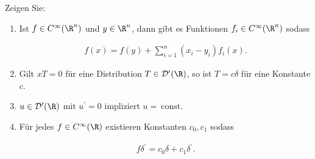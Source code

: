 
\begin{exercise}

Zeigen Sie:

\begin{enumerate}[label = (\roman*)]

    \item Ist $f \in C^\infty(\R^n)$ und $y \in \R^n$, dann gibt es Funktionen $f_i \in C^\infty(\R^n)$ sodass
    
    \begin{align*}
        f(x) = f(y) + \sum_{i=1}^n (x_i - y_i) f_i(x).
    \end{align*}

    \item Gilt $xT = 0$ für eine Distribution $T \in \mathcal{D}^\prime(\R)$, so ist $T = c \delta$ für eine Konstante $c$.
    \item $u \in \mathcal{D}^\prime(\R)$ mit $u^\prime = 0$ impliziert $u = ~\text{const}$.
    \item Für jedes $f \in C^\infty(\R)$ existieren Konstanten $c_0, c_1$ sodass
    
    \begin{align*}
        f \delta^\prime
        =
        c_0 \delta
        +
        c_1 \delta^\prime.
    \end{align*}

\end{enumerate}

\end{exercise}



